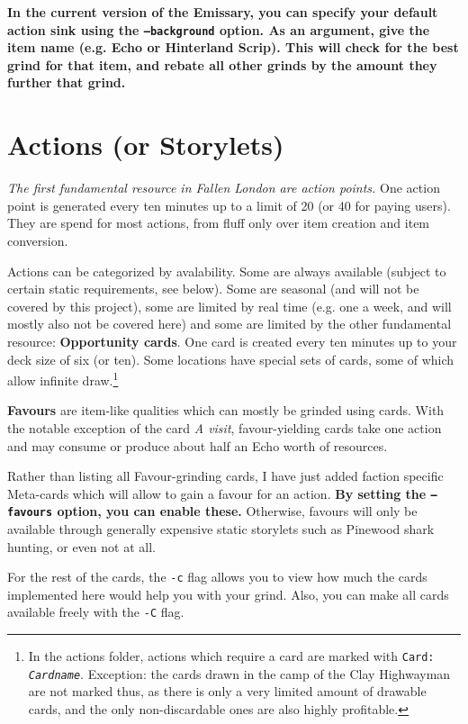 \documentclass[a4paper,11pt,openright,twoside]{scrartcl}
\begin{document}
\textbf{In the current version of the Emissary, you can specify your default action sink using the \texttt{--background} option. As an argument, give the item name (e.g. Echo or Hinterland Scrip). This will check for the best grind for that item, and rebate all other grinds by the amount they further that grind.}

\section{Actions (or Storylets)}

\emph{The first fundamental resource in Fallen London are action points.} One action point is generated every ten minutes up to a limit of 20 (or 40 for paying users). They are spend for most actions, from fluff only over item creation and item conversion.

Actions can be categorized by avalability. Some are always available (subject to certain static requirements, see below). Some are seasonal (and will not be covered by this project), some are limited by real time (e.g. one a week, and will mostly also not be covered here) and some are limited by the other fundamental resource: \textbf{Opportunity cards}. One card is created every ten minutes up to your deck size of six (or ten). Some locations have special sets of cards, some of which allow infinite draw.\footnote{In the actions folder, actions which require a card are marked with \texttt{Card: \emph{Cardname}}. Exception: the cards drawn in the camp of the Clay Highwayman are not marked thus, as there is only a very limited amount of drawable cards, and the only non-discardable ones are also highly profitable.}

\textbf{Favours} are item-like qualities which can mostly be grinded using cards. With the notable exception of the card \emph{A visit}, favour-yielding cards take one action and may consume or produce about half an Echo worth of resources.

Rather than listing all Favour-grinding cards, I have just added faction specific Meta-cards which will allow to gain a favour for an action. \textbf{By setting the \texttt{--favours} option, you can enable these.} Otherwise, favours will only be available through generally expensive static storylets such as Pinewood shark hunting, or even not at all.

For the rest of the cards, the \texttt{-c} flag allows you to view how much the cards implemented here would help you with your grind. Also, you can make all cards available freely with the \texttt{-C} flag. 
\end{document}
